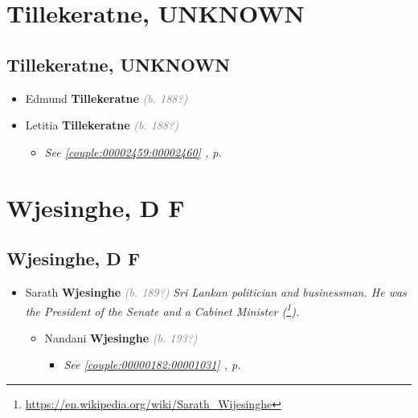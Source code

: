 \documentclass[10pt, openany]{book}
\begin{document}
\part{Tillekeratne, UNKNOWN}
\chapter{Tillekeratne, UNKNOWN}
\label{00002461}
\textcolor{slmaroon}{\textit{}}
\begin{itemize}
\item{Edmund \textbf{Tillekeratne} \textcolor{gray}{\textit{(b. 188?)}}
 }
\item{Letitia \textbf{Tillekeratne} \textcolor{gray}{\textit{(b. 188?)}}
\begin{itemize}
\item{\textcolor{slteal}{\textit{See  \autoref{couple:00002459:00002460} \textit{, p. \pageref{couple:00002459:00002460} }}}}
\end{itemize}
 }
\end{itemize}
 
\part{Wjesinghe, D F}
\chapter{Wjesinghe, D F}
\label{00002529}
\textcolor{slmaroon}{\textit{}}
\begin{itemize}
\item{Sarath \textbf{Wjesinghe} \textcolor{gray}{\textit{(b. 189?)}} \textcolor{slmaroon}{\textit{Sri Lankan politician and businessman. He was the President of the Senate and a Cabinet Minister (\footnote{\url{https://en.wikipedia.org/wiki/Sarath_Wijesinghe}}).}}
\begin{itemize}
\item{Nandani \textbf{Wjesinghe} \textcolor{gray}{\textit{(b. 193?)}}
\begin{itemize}
\item{\textcolor{slteal}{\textit{See  \autoref{couple:00000182:00001031} \textit{, p. \pageref{couple:00000182:00001031} }}}}
\end{itemize}
 }
\end{itemize}
 }
\end{itemize}
  
\end{document}
